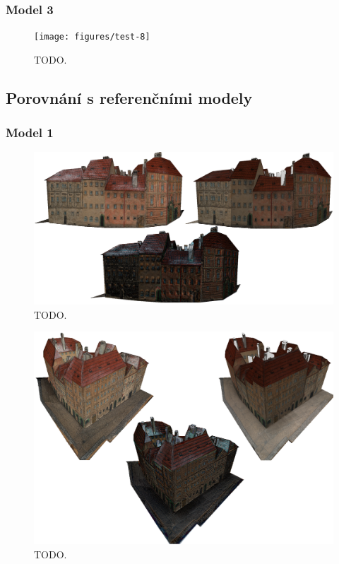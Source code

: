 \documentclass[11pt,twoside,a4paper]{book}
\begin{document}
\subsubsection*{Model 3}

\begin{figure}[h]
\begin{center}
\texttt{[image: figures/test-8]}
\caption{TODO.}
\label{fig:test-8}
\end{center}
\end{figure}


\subsection{Porovnání s referenčními modely}

\subsubsection*{Model 1}

\begin{figure}[h]
\begin{center}
\includegraphics[width=\textwidth]{figures/test-9}
\caption{TODO.}
\label{fig:test-9}
\end{center}
\end{figure}

\begin{figure}[h]
\begin{center}
\includegraphics[width=\textwidth]{figures/test-10}
\caption{TODO.}
\label{fig:test-10}
\end{center}
\end{figure}
\end{document}
